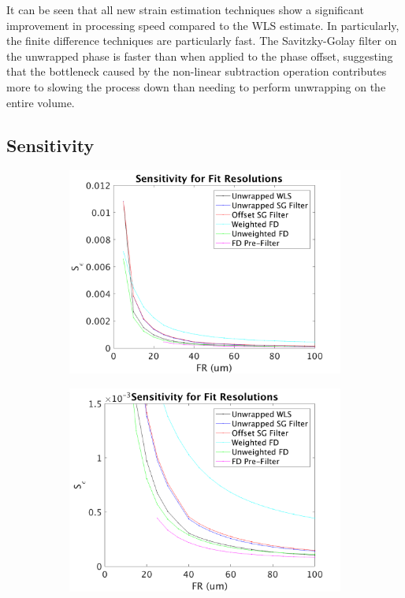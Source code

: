It can be seen that all new strain estimation techniques show a significant improvement in processing speed compared to the WLS estimate. In particularly, the finite difference techniques are particularly fast. The Savitzky-Golay filter on the unwrapped phase is faster than when applied to the phase offset, suggesting that the bottleneck caused by the non-linear subtraction operation contributes more to slowing the process down than needing to perform unwrapping on the entire volume. 

\subsection{Sensitivity}

\begin{figure}[b!]
	\centering
    \begin{subfigure}{0.49\textwidth}
    	\centering
        \includegraphics[width=\textwidth]{figures/sensitivity_lr0.png}
    \end{subfigure}
    \begin{subfigure}{0.49\textwidth}
    	\centering
        \includegraphics[width=\textwidth]{figures/sensitivity_lr0_zoom.png}

\end{subfigure}
\end{figure}

